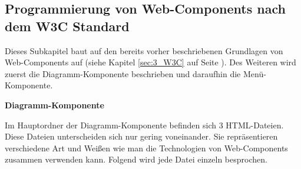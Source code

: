 \subsection{Programmierung von Web-Components nach dem W3C Standard}
\label{sec:4_WC_Pur}

Dieses Subkapitel baut auf den bereits vorher beschriebenen Grundlagen von Web-Components auf (siehe Kapitel \ref{sec:3_W3C} auf Seite \pageref{sec:3_W3C}). Des Weiteren wird zuerst die Diagramm-Komponente beschrieben und daraufhin die Menü-Komponente.

\textbf{Diagramm-Komponente}

Im Hauptordner der Diagramm-Komponente befinden sich 3 HTML-Dateien. Diese Dateien unterscheiden sich nur gering voneinander. Sie repräsentieren verschiedene Art und Weißen wie man die Technologien von Web-Components zusammen verwenden kann. Folgend wird jede Datei einzeln besprochen.


